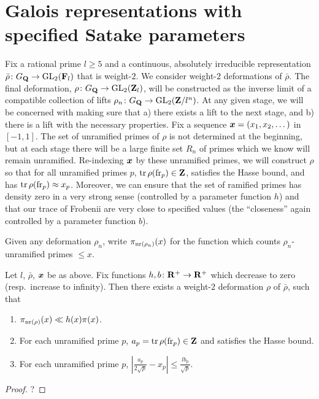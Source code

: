 \section{Galois representations with specified Satake parameters}

Fix a rational prime $l\geqslant 5$ and a continuous, absolutely irreducible 
representation $\bar\rho\colon G_{\mathbf{Q}} \to \operatorname{GL}_2(\mathbf{F}_l)$ that is weight-$2$. We 
consider weight-$2$ deformations of $\bar\rho$. The final deformation, 
$\rho\colon G_{\mathbf{Q}} \to \operatorname{GL}_2(\mathbf{Z}_l)$, will be constructed as the inverse limit 
of a compatible collection of lifts $\rho_n\colon G_{\mathbf{Q}} \to \operatorname{GL}_2(\mathbf{Z}/l^n)$. At 
any given stage, we will be concerned with making sure that a) there exists a 
lift to the next stage, and b) there is a lift with the necessary properties. 
Fix a sequence ${\boldsymbol x}=(x_1,x_2,\dots)$ in $[-1,1]$. The set of unramified primes 
of $\rho$ is not determined at the beginning, but at each stage there will be 
a large finite set $R_n$ of primes which we know will remain unramified. 
Re-indexing ${\boldsymbol x}$ by these unramified primes, we will construct $\rho$ so that 
for all unramified primes $p$, $\operatorname{tr}\rho(\mathrm{fr}_p)\in \mathbf{Z}$, satisfies the Hasse 
bound, and has $\operatorname{tr}\rho(\mathrm{fr}_p) \approx x_p$. Moreover, we can ensure that the 
set of ramified primes has density zero in a very strong sense (controlled by a 
parameter function $h$) and that our trace of Frobenii are very close to 
specified values (the ``closeness'' again controlled by a parameter function 
$b$). 

Given any deformation $\rho_n$, write $\pi_{\mathrm{nr}(\rho_n)}(x)$ for the function 
which counts $\rho_n$-unramified primes $\leqslant x$. 

\begin{theorem}
Let $l$, $\bar\rho$, ${\boldsymbol x}$ be as above. Fix functions 
$h,b\colon \mathbf{R}^+\to \mathbf{R}^+$ which decrease to zero (resp.~increase to infinity). 
Then there exists a weight-$2$ deformation $\rho$ of $\bar\rho$, such that 
\begin{enumerate}
\item
$\pi_{\mathrm{nr}(\rho)}(x) \ll h(x) \pi(x)$. 

\item
For each unramified prime $p$, $a_p=\operatorname{tr}\rho(\mathrm{fr}_p)\in \mathbf{Z}$ and satisfies the 
Hasse bound. 

\item
For each unramified prime $p$, 
$\left| \frac{a_p}{2\sqrt p} - x_p\right| \leqslant \frac{l b_p}{\sqrt p}$. 
\end{enumerate}
\end{theorem}
\begin{proof}
?
\end{proof}


